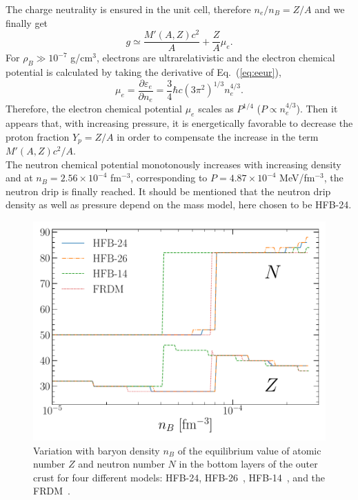 %
The charge neutrality is ensured in the unit cell, therefore $n_e/n_B = Z/A$ 
and we finally get
%
\begin{equation}
  g \simeq \frac{M'(A,Z)c^2}{A} + \frac{Z}{A}\mu_e.
\end{equation}
%
For $\rho_B \gg 10^{-7}$ g/cm$^3$, electrons are ultrarelativistic and the
electron chemical potential is calculated by taking the derivative of
Eq.~(\ref{eq:eeur}),
%
\begin{equation}
  \mu_e = \frac{\partial \varepsilon_e}{\partial n_e} =
  \frac{3}{4}\hbar c(3\pi^2)^{1/3}n_e^{4/3}.
\end{equation}
%
Therefore, the electron chemical potential $\mu_e$ scales as $P^{1/4}$ ($P \propto
n_e^{4/3}$). Then it appears that, with increasing pressure, it is
energetically favorable to decrease the proton fraction $Y_p = Z/A$ in
order to compensate the increase in the term $M'(A,Z)c^2/A$.\\
The neutron chemical potential monotonously increases with increasing density 
and at $n_B = 2.56\times 10^{-4}$ fm$^{-3}$, corresponding to $P = 4.87\times
10^{-4}$ MeV/fm$^{-3}$, the neutron drip is finally
reached. It should be mentioned that the neutron drip density as well as
pressure depend on the mass model, here chosen to be HFB-24.

\begin{figure}[!t]
\begin{center}
  \includegraphics[width=0.8\linewidth]{figures/ocrust_model.pdf}
\end{center}
\caption[Ground-state composition versus baryon density in the 
outer crust]{Variation with baryon density $n_B$ of the equilibrium value of 
  atomic number $Z$ and neutron number $N$ in the bottom layers of the outer 
  crust for four different models: HFB-24, HFB-26~\cite{Goriely2013}, 
  HFB-14~\cite{Goriely2007}, and the FRDM~\cite{Moller1995}.}\label{fig:ocrust_model}
\end{figure}

